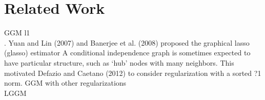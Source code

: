 \section{Related Work}
\label{related}
GGM l1\\
. Yuan and Lin (2007) and Banerjee et al. (2008) proposed the graphical lasso (glasso) estimator
A conditional independence graph is sometimes expected to have particular structure, such as ‘hub’ nodes with many neighbors. This motivated Defazio and Caetano (2012) to consider
regularization with a sorted ?1 norm.
GGM with other regularizations\\
LGGM\\
\citet{hosseini2016learning}
\citet{chandrasekaran2010}